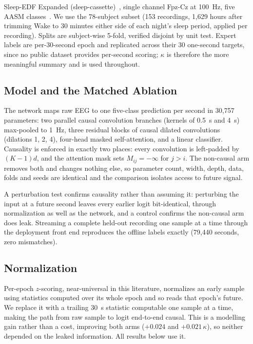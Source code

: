 \documentclass[conference]{IEEEtran}
\begin{document}
Sleep-EDF Expanded (sleep-cassette)~\cite{physionet, kemp}, single channel Fpz-Cz at 100~Hz, five
AASM classes~\cite{aasm}. We use the 78-subject subset (153 recordings, 1{,}629 hours after
trimming Wake to 30 minutes either side of each night's sleep period, applied per recording).
Splits are subject-wise 5-fold, verified disjoint by unit test. Expert labels are per-30-second
epoch and replicated across their 30 one-second targets, since no public dataset provides
per-second scoring; $\kappa$ is therefore the more meaningful summary and is used throughout.

\subsection{Model and the Matched Ablation}

The network maps raw EEG to one five-class prediction per second in 30{,}757 parameters: two
parallel causal convolution branches (kernels of 0.5~s and 4~s) max-pooled to 1~Hz, three residual
blocks of causal dilated convolutions (dilations 1, 2, 4), four-head masked self-attention, and a
linear classifier. Causality is enforced in exactly two places: every convolution is left-padded by
$(K-1)d$, and the attention mask sets $M_{ij} = -\infty$ for $j > i$. The non-causal arm removes
both and changes nothing else, so parameter count, width, depth, data, folds and seeds are
identical and the comparison isolates access to future signal.

A perturbation test confirms causality rather than assuming it: perturbing the input at a future
second leaves every earlier logit bit-identical, through normalization as well as the network, and
a control confirms the non-causal arm does leak. Streaming a complete held-out recording one sample
at a time through the deployment front end reproduces the offline labels exactly (79{,}440 seconds,
zero mismatches).

\subsection{Normalization}

Per-epoch $z$-scoring, near-universal in this literature, normalizes an early sample using
statistics computed over its whole epoch and so reads that epoch's future. We replace it with a
trailing 30~s statistic computable one sample at a time, making the path from raw sample to logit
end-to-end causal. This is a modelling gain rather than a cost, improving both arms ($+0.024$ and
$+0.021\,\kappa$), so neither depended on the leaked information. All results below use it.
\end{document}
